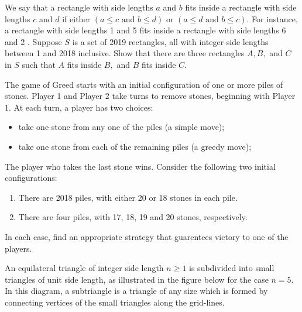 \documentclass{pset}
\begin{document}
\begin{problems}
\begin{problem}[IrMO 2018 Q4]
    We say that a rectangle with side lengths \(a\) and \(b\) fits inside a rectangle with side lengths \(c\) and \(d\) if either \((a \leq c \text { and } b \leq d)\) or \((a \leq d \text { and } b \leq c) .\) For instance, a rectangle with side lengths 1 and 5 fits inside a rectangle with side lengths 6 and 2 . Suppose \(S\) is a set of 2019 rectangles, all with integer side lengths between 1 and 2018 inclusive. Show that there are three rectangles \(A, B,\) and \(C\) in \(S\) such that \(A\) fits inside \(B,\) and \(B\) fits inside \(C .\)
\end{problem}

\begin{problem}[IrMO 2018 Q10]
    The game of Greed starts with an initial configuration of one or more piles of stones. Player 1 and Player 2 take turns to remove stones, beginning with Player 1. At each turn, a player has two choices:
    \begin{itemize}
        \item take one stone from any one of the piles (a simple move);
        \item take one stone from each of the remaining piles (a greedy move);
    \end{itemize}
    The player who takes the last stone wins. Consider the following two initial configurations:
    \begin{enumerate}
        \item There are 2018 piles, with either 20 or 18 stones in each pile.
        \item There are four piles, with 17, 18, 19 and 20 stones, respectively.
    \end{enumerate}
    In each case, find an appropriate strategy that guarentees victory to one of the players.
\end{problem}

\begin{problem}[IrMO 2017 Q4]
    An equilateral triangle of integer side length \(n \geq 1\) is subdivided into small triangles of unit side length, as illustrated in the figure below for the case \(n=5 .\) In this diagram, a subtriangle is a triangle of any size which is formed by connecting vertices of the small triangles along the grid-lines.
    \begin{center}

\begin{tikzpicture}[x=0.75pt,y=0.75pt,yscale=-0.5,xscale=0.5]


\end{tikzpicture}
\end{center}
\end{problem}
\end{problems}
\end{document}

